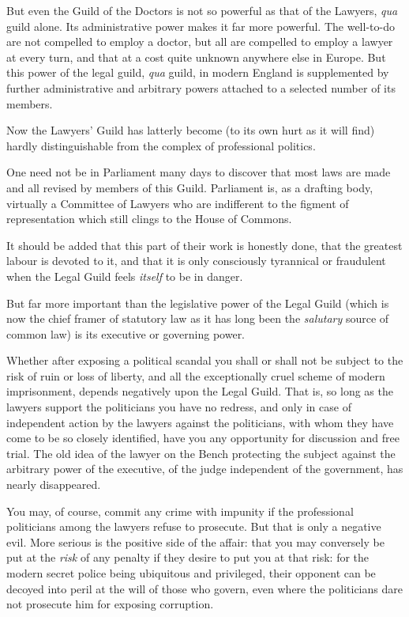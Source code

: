 \documentclass{book}
\begin{document}
But even the Guild of the Doctors is not so powerful as that of the Lawyers, \emph{qua} guild alone. Its administrative power makes it far more powerful. The well-to-do are not compelled to employ a doctor, but all are compelled to employ a lawyer at every turn, and that at a cost quite unknown anywhere else in Europe. But this power of the legal guild, \emph{qua} guild, in modern England is supplemented by further administrative and arbitrary powers attached to a selected number of its members.

Now the Lawyers’ Guild has latterly become (to its own hurt as it will find) hardly distinguishable from the complex of professional politics.

One need not be in Parliament many days to discover that most laws are made and all revised by members of this Guild. Parliament is, as a drafting body, virtually a Committee of Lawyers who are indifferent to the figment of representation which still clings to the House of Commons.

It should be added that this part of their work is honestly done, that the greatest labour is devoted to it, and that it is only consciously tyrannical or fraudulent when the Legal Guild feels \emph{itself} to be in danger.

But far more important than the legislative power of the Legal Guild (which is now the chief framer of statutory law as it has long been the \emph{salutary} source of common law) is its executive or governing power.

Whether after exposing a political scandal you shall or shall not be subject to the risk of ruin or loss of liberty, and all the exceptionally cruel scheme of modern imprisonment, depends negatively upon the Legal Guild. That is, so long as the lawyers support the politicians you have no redress, and only in case of independent action by the lawyers against the politicians, with whom they have come to be so closely identified, have you any opportunity for discussion and free trial. The old idea of the lawyer on the Bench protecting the subject against the arbitrary power of the executive, of the judge independent of the government, has nearly disappeared.

You may, of course, commit any crime with impunity if the professional politicians among the lawyers refuse to prosecute. But that is only a negative evil. More serious is the positive side of the affair: that you may conversely be put at the \emph{risk} of any penalty if they desire to put you at that risk: for the modern secret police being ubiquitous and privileged, their opponent can be decoyed into peril at the will of those who govern, even where the politicians dare not prosecute him for exposing corruption.
\end{document}
